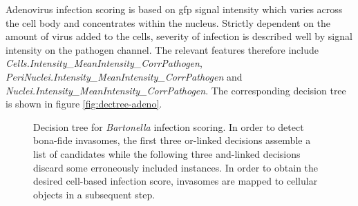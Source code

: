 Adenovirus infection scoring is based on \gls{gfp} signal intensity which varies across the cell body and concentrates within the nucleus. Strictly dependent on the amount of virus added to the cells, severity of infection is described well by signal intensity on the pathogen channel. The relevant features therefore include \textit{Cells.Intensity\_MeanIntensity\_CorrPathogen}, \textit{PeriNuclei.Intensity\_MeanIn\-tensity\_CorrPathogen} and \textit{Nuclei.Intensity\_MeanIntensity\_CorrPathogen}. The corresponding decision tree is shown in figure \ref{fig:dectree-adeno}.

\begin{figure}
  \centering
  \caption[Decision tree for \textit{Bartonella} infection scoring.]{Decision tree for \textit{Bartonella} infection scoring. In order to detect bona-fide invasomes, the first three or-linked decisions assemble a list of candidates while the following three and-linked decisions discard some erroneously included instances. In order to obtain the desired cell-based infection score, invasomes are mapped to cellular objects in a subsequent step.}
  \label{fig:dectree-bartonella}
\end{figure}

